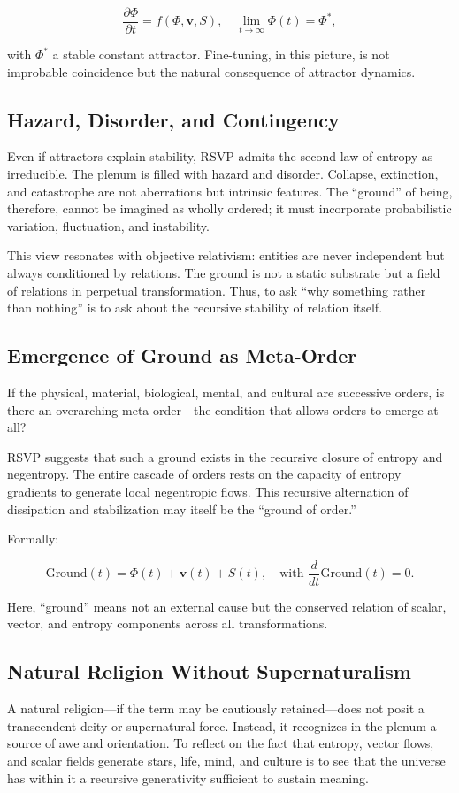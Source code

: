 \documentclass[12pt]{book}
\begin{document}
\[ \frac{\partial \Phi}{\partial t} = f(\Phi, \mathbf{v}, S), \quad \lim_{t\to\infty} \Phi(t) = \Phi^*, \]

with \( \Phi^* \) a stable constant attractor. Fine-tuning, in this picture, is not improbable coincidence but the natural consequence of attractor dynamics.

\subsection{Hazard, Disorder, and Contingency}
Even if attractors explain stability, RSVP admits the second law of entropy as irreducible. The plenum is filled with hazard and disorder. Collapse, extinction, and catastrophe are not aberrations but intrinsic features. The “ground” of being, therefore, cannot be imagined as wholly ordered; it must incorporate probabilistic variation, fluctuation, and instability.

This view resonates with objective relativism: entities are never independent but always conditioned by relations. The ground is not a static substrate but a field of relations in perpetual transformation. Thus, to ask “why something rather than nothing” is to ask about the recursive stability of relation itself.

\subsection{Emergence of Ground as Meta-Order}
If the physical, material, biological, mental, and cultural are successive orders, is there an overarching meta-order—the condition that allows orders to emerge at all?

RSVP suggests that such a ground exists in the recursive closure of entropy and negentropy. The entire cascade of orders rests on the capacity of entropy gradients to generate local negentropic flows. This recursive alternation of dissipation and stabilization may itself be the “ground of order.”

Formally:

\[ \text{Ground}(t) = \Phi(t) + \mathbf{v}(t) + S(t), \quad \text{with } \frac{d}{dt}\text{Ground}(t) = 0. \]

Here, “ground” means not an external cause but the conserved relation of scalar, vector, and entropy components across all transformations.

\subsection{Natural Religion Without Supernaturalism}
A natural religion—if the term may be cautiously retained—does not posit a transcendent deity or supernatural force. Instead, it recognizes in the plenum a source of awe and orientation. To reflect on the fact that entropy, vector flows, and scalar fields generate stars, life, mind, and culture is to see that the universe has within it a recursive generativity sufficient to sustain meaning.
\end{document}
